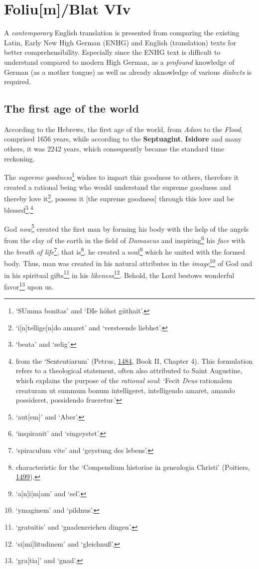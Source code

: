 \documentclass[
]{article}
\author{Dietmar Gerald Schrausser}
\date{09.05.2026}
\begin{document}
\hypertarget{foliumblat-viv}{%
\section{Foliu{[}m{]}/Blat VIv}\label{foliumblat-viv}}

A \emph{contemporary} English translation is presented from comparing
the existing Latin, Early New High German (ENHG) and English
(translation) texts for better comprehensibility. Especially since the
ENHG text is difficult to understand compared to modern High German, as
a \emph{profound} knowledge of German (as a mother tongue) as well as
already aknowledge of various \emph{dialects} is required.

\hypertarget{the-first-age-of-the-world}{%
\subsection{The first age of the
world}\label{the-first-age-of-the-world}}

According to the Hebrews, the first age of the world, from \emph{Adam}
to the \emph{Flood}, comprised 1656 years, while according to the
\textbf{Septuagint}, \textbf{Isidore} and many others, it was 2242
years, which consequently became the standard time reckoning.

The \emph{supreme goodness}\footnote{`SUmma bonitas' and `DIe höhst
  gůthait'.} wishes to impart this goodness to others, therefore it
created a rational being who would understand the supreme goodness and
thereby love it\footnote{`i{[}n{]}tellige{[}n{]}do amaret' and
  `versteende liebhet'.}, possess it {[}the supreme goodness{]} through
this love and be blessed\footnote{`beata' and `selig'.}.\footnote{from
  the `Sententiarum' (Petrus,
  \href{https://doi.org/10.3931/e-rara-18241}{1484}, Book II, Chapter
  4). This formulation refers to a theological statement, often also
  attributed to Saint Augustine, which explains the purpose of the
  \emph{rational soul}: `Fecit \emph{Deus} rationalem creaturam ut
  summum bonum intelligeret, intelligendo amaret, amando possideret,
  possidendo frueretur.'}

God \emph{now}\footnote{`aut{[}em{]}' and `Aber'.} created the first man
by forming his body with the help of the angels from the clay of the
earth in the field of \emph{Damascus} and inspiring\footnote{`inspirauit'
  and `eingeystet'.} his \emph{face} with the \emph{breath of
life}\footnote{`spiraculum vite' and `geystung des lebens'.}, that
is\footnote{characteristic for the `Compendium historiae in genealogia
  Christi' (Poitiers,
  \href{https://libwww.freelibrary.org/digital/item/22446}{1499}).}, he
created a soul\footnote{`a{[}n{]}i{[}m{]}am' and `sel'.} which he united
with the formed body. Thus, man was created in his natural attributes in
the \emph{image}\footnote{`ymaginem' and `pildnus'.} of God and in his
spiritual gifts\footnote{`gratuitis' and `gnadenreichen dingen'.} in his
\emph{likeness}\footnote{`si{[}mi{]}litudinem' and `gleichnuß'.}.
Behold, the Lord bestows wonderful favor\footnote{`gra{[}tia{]}' and
  `gnad'.} upon us.
\end{document}
